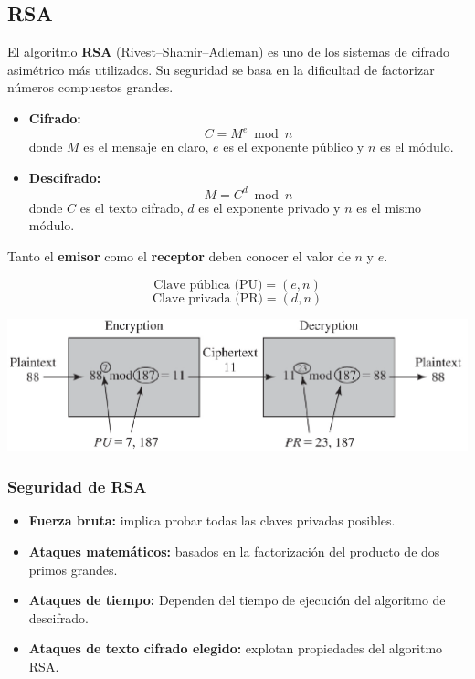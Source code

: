 \documentclass[11pt,a4paper]{article}
\begin{document}
\subsection{RSA}

El algoritmo \textbf{RSA} (Rivest–Shamir–Adleman) es uno de los sistemas de cifrado asimétrico más utilizados.
Su seguridad se basa en la dificultad de factorizar números compuestos grandes.

\begin{itemize}
    \item \textbf{Cifrado:}
    \[
    C = M^e \bmod n
    \]
    donde \( M \) es el mensaje en claro, \( e \) es el exponente público y \( n \) es el módulo.

    \item \textbf{Descifrado:}
    \[
    M = C^d \bmod n
    \]
    donde \( C \) es el texto cifrado, \( d \) es el exponente privado y \( n \) es el mismo módulo.
\end{itemize}

Tanto el \textbf{emisor} como el \textbf{receptor} deben conocer el valor de \( n \) y \( e \).

\[
\text{Clave pública (PU)} = (e, n)
\]
\[
\text{Clave privada (PR)} = (d, n)
\]

\begin{center}
    \includegraphics[width=1\textwidth]{resources/RSA_Encryption_Decryption.png}
\end{center}

\subsubsection*{Seguridad de RSA}

\begin{itemize}
    \item \textbf{Fuerza bruta:} implica probar todas las claves privadas posibles.
    \item \textbf{Ataques matemáticos:} basados en la factorización del producto de dos primos grandes.
    \item \textbf{Ataques de tiempo:} Dependen del tiempo de ejecución del algoritmo de descifrado.
    \item \textbf{Ataques de texto cifrado elegido:} explotan propiedades del algoritmo RSA.
\end{itemize}
\end{document}
